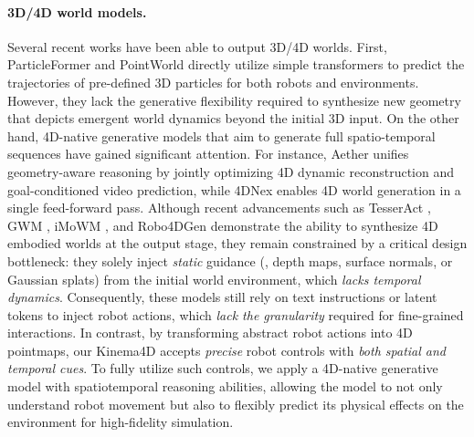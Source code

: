 \paragraph{3D/4D world models.}
Several recent works have been able to output 3D/4D worlds. First, ParticleFormer \cite{huang2025particleformer} and PointWorld \cite{huang2026pointworld} directly utilize simple transformers to predict the trajectories of pre-defined 3D particles for both robots and environments. However, they lack the generative flexibility required to synthesize new geometry that depicts emergent world dynamics beyond the initial 3D input.
On the other hand, 4D-native generative models that aim to generate full spatio-temporal sequences have gained significant attention. For instance, Aether \cite{Aether} unifies geometry-aware reasoning by jointly optimizing 4D dynamic reconstruction and goal-conditioned video prediction, while 4DNex \cite{chen20254dnex} enables 4D world generation in a single feed-forward pass. 
Although recent advancements such as TesserAct \cite{zhen2025tesseract}, GWM \cite{lu2025gwm}, iMoWM \cite{zhang2025imowm}, and Robo4DGen \cite{robo4dgen} demonstrate the ability to synthesize 4D embodied worlds at the output stage, they remain constrained by a critical design bottleneck: they solely inject \textit{static} guidance (\eg, depth maps, surface normals, or Gaussian splats) from the initial world environment, which \textit{lacks temporal dynamics}. Consequently, these models still rely on text instructions or latent tokens to inject robot actions, which \textit{lack the granularity} required for fine-grained interactions. In contrast, by transforming abstract robot actions into 4D pointmaps, our Kinema4D accepts \textit{precise} robot controls with \textit{both spatial and temporal cues}. To fully utilize such controls, we apply a 4D-native generative model with spatiotemporal reasoning abilities, allowing the model to not only understand robot movement but also to flexibly predict its physical effects on the environment for high-fidelity simulation.
